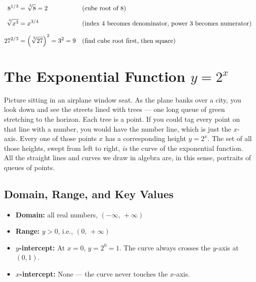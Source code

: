 \documentclass[12pt, letterpaper]{book}
\newcommand{\nthroot}[2]{\sqrt[\leftroot{-1}\uproot{2}#1]{#2}}
\begin{document}
\begin{examplebox}
\begin{align*}
  8^{1/3} &= \nthroot{3}{8} = 2
    && \text{(cube root of 8)}\\[6pt]
  \nthroot{4}{x^3} &= x^{3/4}
    && \text{(index 4 becomes denominator, power 3 becomes numerator)}\\[6pt]
  27^{2/3} &= \left(\nthroot{3}{27}\right)^2 = 3^2 = 9
    && \text{(find cube root first, then square)}
\end{align*}
\end{examplebox}

\newpage
\section{The Exponential Function \texorpdfstring{$y = 2^x$}{y = 2\^{}x}}

\begin{storybox}
Picture sitting in an airplane window seat.  As the plane banks over a city, you
look down and see the streets lined with trees --- one long queue of green
stretching to the horizon.  Each tree is a point.  If you could tag every point on
that line with a number, you would have the number line, which is just the $x$-axis.
Every one of those points $x$ has a corresponding height $y = 2^x$.  The set of all
those heights, swept from left to right, \emph{is} the curve of the exponential
function.  All the straight lines and curves we draw in algebra are, in this sense,
portraits of queues of points.
\end{storybox}

\subsection*{Domain, Range, and Key Values}

\begin{definitionbox}[Key Facts about $y = 2^x$]
\begin{itemize}[noitemsep, leftmargin=*]
  \item \textbf{Domain:} all real numbers, $(-\infty,\, +\infty)$
  \item \textbf{Range:} $y > 0$, i.e., $(0,\, +\infty)$
  \item \textbf{$y$-intercept:} At $x = 0$,\; $y = 2^0 = 1$.\; The curve always crosses the $y$-axis at $(0,1)$.
  \item \textbf{$x$-intercept:} None --- the curve never touches the $x$-axis.
\end{itemize}
\end{definitionbox}
\end{document}
